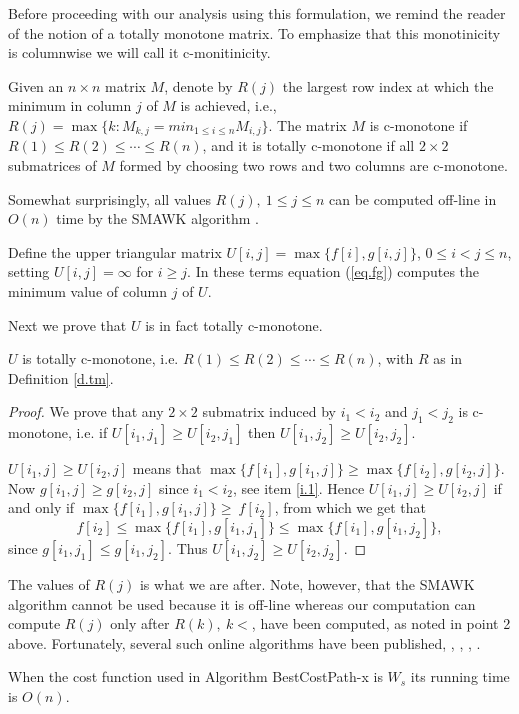 Before proceeding with our analysis using this formulation, we remind the reader of the notion of 
a totally monotone matrix. To emphasize that this monotinicity is columnwise we will call it 
c-monitinicity.
\begin{definition}\label{d.tm}
	Given an $n \times n$ matrix $M$, denote
	by $R(j)$ the largest row index at which the minimum in column $j$ of $M$ is achieved, 
	i.e.,
	$R(j) = \max \{k :M_{k,j} = min_{1\leq i \leq n} M_{i,j}\}$.
	The matrix $M$ is c-monotone if $R(1) \leq  R(2)\leq \cdots \leq R(n)$, and it is totally c-monotone 
	if all $2\times 2$
	submatrices of $M$ formed by choosing two rows and two columns are c-monotone.
\end{definition}
Somewhat surprisingly, all values $R(j),\ 1\leq j \leq n$ 
can be computed off-line in $O(n)$ time by the SMAWK algorithm \cite{smawk1987}.
	
Define the upper triangular matrix $U[i,j]=\max \{ f[i], g[i, j]\}$, $ 0\leq i <j \leq n$,
setting $U[i,j]=\infty$ for $i\geq j$.
In these terms equation (\ref{eq.fg}) computes the minimum value of column $j$ of $U$.

 Next we prove that $U$ is in fact totally c-monotone.
\begin{proposition}
	$U$ is totally c-monotone, i.e.
	$R(1) \leq  R(2)\leq \cdots \leq R(n)$, with $R$ as in Definition \ref{d.tm}.

\end{proposition}
\begin{proof}
	We prove that any $2 \times 2$ submatrix induced by $i_1<i_2$ and $j_1<j_2$ is c-monotone,
	i.e. if $U[i_1,j_1]\geq U[i_2,j_1]$ then $U[i_1,j_2]\geq U[i_2,j_2]$.
		
		 $U[i_1,j]\geq U[i_2,j]$ means that
$\max \{ f[i_1], g[i_1, j]\}\geq \max \{ f[i_2], g[i_2, j]\}$. Now $g[i_1, j]\geq g[i_2, j]$
since $i_1<i_2$, see item \ref{i.1}. Hence $U[i_1,j]\geq U[i_2,j]$ if and only if 
$\max \{ f[i_1], g[i_1, j]\}\geq \ f[i_2]$, from which we get that  
$$ f[i_2]\leq \max \{ f[i_1], g[i_1, j_1]\}\leq \max \{ f[i_1], g[i_1, j_2]\},$$
since $g[i_1, j_1]\leq g[i_1, j_2]$.
Thus $U[i_1,j_2]\geq U[i_2,j_2]$.
\end{proof}

The values of $R(j)$ is what we are after. Note, however, that the SMAWK algorithm cannot
be used because it is off-line whereas our computation can compute $R(j)$ only
after $R(k),\ k<$, have been computed, as noted in point 2 above.
Fortunately, several such online algorithms have been published, 
\cite{klawe89}, \cite{galil92}, \cite{larmore91},
\cite{barnoy09}.

\begin{theorem}
	When the cost function used in Algorithm BestCostPath-x is $W_s$ its running time is $O(n)$.
\end{theorem}

\
